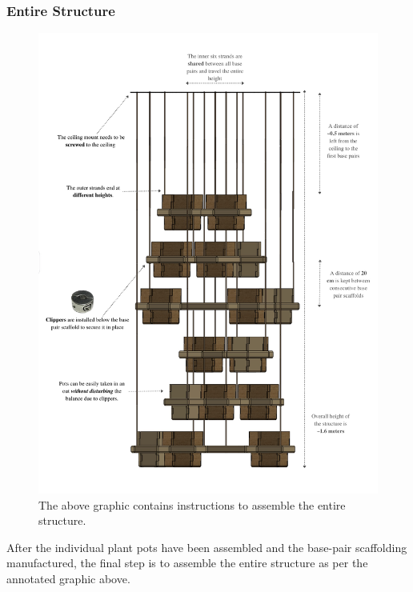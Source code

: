 \documentclass[12pt]{extarticle} %
\begin{document}
\subsubsection{Entire Structure}
\begin{figure}[H]
    \centering
    \includegraphics[scale=0.24, angle=-90]{images/screenshots/assembly_instructions.jpeg}
    \caption{The above graphic contains instructions to assemble the entire structure.}
    \label{fig:entire_assembly_instructions}
\end{figure}

After the individual plant pots have been assembled and the base-pair scaffolding manufactured, the final step is to assemble the entire structure as per the annotated graphic above.  
\pagebreak
\end{document}
